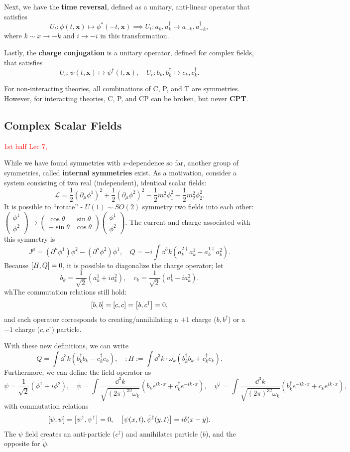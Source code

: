 \documentclass{article}
\begin{document}
Next, we have the \textbf{time reversal}, defined as a unitary, anti-linear operator that satisfies
$$U_t:\phi(t,\mathbf x)\mapsto\phi^*(-t,\mathbf x)\implies U_t:a_k,a^\dag_k\mapsto a_{-k},a^\dag_{-k},$$
where $k\sim\dot x\to-k$ and $i\to-i$ in this transformation. 

Lastly, the \textbf{charge conjugation} is a unitary operator, defined for complex fields, that satisfies
$$U_c:\psi(t,\mathbf x)\mapsto\psi^\dag(t,\mathbf x),\quad U_c:b_k,b^\dag_k\mapsto c_k,c^\dag_k.$$

For non-interacting theories, all combinations of C, P, and T are symmetries. However, for interacting theories, C, P, and CP can be broken, but never \textbf{CPT}.

\subsection{Complex Scalar Fields}
\textcolor{red}{1st half Lec 7, }

While we have found symmetries with $x$-dependence so far, another group of symmetries, called \textbf{internal symmetries} exist. As a motivation, consider a system consisting of two real (independent), identical scalar fields:
$$\mathcal L=\frac 12(\partial_\mu\phi^1)^2+\frac 12(\partial_\mu\phi^2)^2-\frac 12m_1^2\phi_1^2-\frac 12m_2^2\phi_2^2.$$
It is possible to ``rotate'' - $U(1)\sim SO(2)$ symmetry two fields into each other: $\begin{pmatrix}\phi^1\\\phi^2\end{pmatrix}\to\begin{pmatrix}\cos\theta&\sin\theta\\-\sin\theta&\cos\theta\end{pmatrix}\begin{pmatrix}\phi^1\\\phi^2\end{pmatrix}.$ The current and charge associated with this symmetry is 
$$J^\mu=(\partial^\mu\phi^1)\phi^2-(\partial^\mu\phi^2)\phi^1,\quad Q=-i\int\dd^3k(a^{2\dag}_ka^1_k-a^{1\dag}_ka^2_k).$$
Because $\comm{H}{Q}=0$, it is possible to diagonalize the charge operator; let 
$$b_k=\frac 1{\sqrt 2}(a^1_k+ia_k^2),\quad c_k=\frac 1{\sqrt 2}(a^1_k-ia^2_k).$$
whThe commutation relations still hold:
$$\comm{b}{b}=\comm{c}{c}=\comm{b}{c^\dag}=0,$$
and each operator corresponds to creating/annihilating a $+1$ charge ($b,b^\dag$) or a $-1$ charge ($c,c^\dag$) particle.

With these new definitions, we can write 
$$Q=\int\dd^3k(b^\dag_kb_k-c^\dag_kc_k),\quad:H:=\int\dd^3k\cdot\omega_k(b^\dag_kb_k+c^\dag_kc_k).$$
Furthermore, we can define the field operator as 
$$\psi=\frac 1{\sqrt 2}(\phi^1+i\phi^2),\quad\psi=\int\frac{\dd^3k}{\sqrt{(2\pi)^32\omega_k}}(b_ke^{ik\cdot x}+c^\dag_ke^{-ik\cdot x}),\quad \psi^\dag=\int\frac{\dd^3k}{\sqrt{(2\pi)^32\omega_k}}(b^\dag_ke^{-ik\cdot x}+c_ke^{ik\cdot x}),$$
with commutation relations
$$\comm{\psi}{\psi}=\comm{\psi^\dag}{\psi^\dag}=0,\quad\comm{\psi(x,t)}{\dot\psi^\dag(y,t)}=i\delta(x-y).$$
The $\psi$ field creates an anti-particle ($c^\dag$) and annihilates particle ($b$), and the opposite for $\tilde\psi$. 
\end{document}
